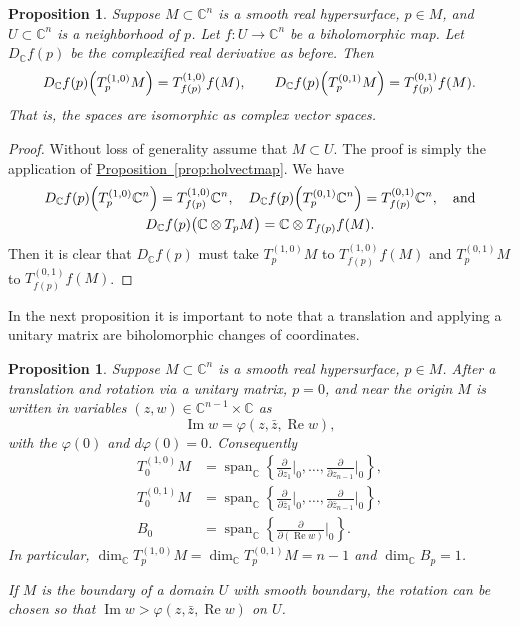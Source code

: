 \documentclass[12pt,openany]{book}
\renewcommand{\Re}{\operatorname{Re}}
\renewcommand{\Im}{\operatorname{Im}}
\newcommand{\C}{{\mathbb{C}}}
\theoremstyle{plain}
\newtheorem{prop}[thm]{Proposition}
\theoremstyle{remark}
\theoremstyle{definition}
\theoremstyle{exercise}
\theoremstyle{example}
\newcommand{\propref}[1]{\hyperref[#1]{Proposition~\ref*{#1}}}
\begin{document}
\begin{prop}
Suppose $M \subset \C^n$ is a smooth real hypersurface, $p \in M$,
and $U \subset \C^n$ is a neighborhood of $p$.
Let $f \colon U \to \C^n$ be a biholomorphic map.  Let $D_\C f(p)$ be
the complexified real derivative as before.  Then
\begin{equation*}
D_\C f(p)\Bigl(T_p^{(1,0)}M\Bigr) = T_{f(p)}^{(1,0)}f(M), \qquad
D_\C f(p)\Bigl(T_p^{(0,1)}M\Bigr) = T_{f(p)}^{(0,1)}f(M).
\end{equation*}
That is, the spaces are isomorphic as complex vector spaces.
\end{prop}

\begin{proof}
Without loss of generality assume that $M \subset U$.
The proof is simply the application of \propref{prop:holvectmap}.  We have
\begin{multline*}
D_\C f(p)\Bigl(T_p^{(1,0)}\C^n\Bigr) = T_{f(p)}^{(1,0)}\C^n, \quad 
D_\C f(p)\Bigl(T_p^{(0,1)}\C^n\Bigr) = T_{f(p)}^{(0,1)}\C^n, \quad
\text{and} \\
D_\C f(p)\bigl(\C \otimes T_pM\bigr) =\C \otimes  T_{f(p)}f(M) .
\end{multline*}
Then it is clear that $D_\C f(p)$ must take
$T_p^{(1,0)}M$ to $T_{f(p)}^{(1,0)}f(M)$ and
$T_p^{(0,1)}M$ to $T_{f(p)}^{(0,1)}f(M)$.
\end{proof}

In the next proposition it is important to note that a translation and
applying a unitary matrix are biholomorphic changes of coordinates.

\begin{prop}
Suppose $M \subset \C^n$ is a smooth real hypersurface, $p \in M$.
After a translation and rotation via a unitary
matrix, $p=0$, and near the origin
$M$ is written in variables $(z,w) \in \C^{n-1}
\times \C$ as
\begin{equation*}
\Im w = \varphi(z,\bar{z},\Re w) ,
\end{equation*}
with the $\varphi(0)$  and $d\varphi(0) = 0$.  Consequently
\begin{align*}
T_0^{(1,0)} M
& = \operatorname{span}_{\C} \left\{
\frac{\partial}{\partial z_1}\Big|_0,
\ldots,
\frac{\partial}{\partial z_{n-1}}\Big|_0 \right\} ,
\\
T_0^{(0,1)} M
& = \operatorname{span}_{\C} \left\{
\frac{\partial}{\partial \bar{z}_1}\Big|_0,
\ldots,
\frac{\partial}{\partial \bar{z}_{n-1}}\Big|_0 \right\} ,
\\
B_0 & = \operatorname{span}_{\C} \left\{
\frac{\partial}{\partial (\Re w)}\Big|_0 \right\} .
\end{align*}
In particular,
$\dim_\C T_p^{(1,0)} M = \dim_\C T_p^{(0,1)} M = n-1$ and 
$\dim_\C B_p = 1$.

If $M$ is the boundary of a domain $U$ with smooth boundary,
the rotation can be chosen so that
$\Im w > \varphi(z,\bar{z},\Re w)$ on $U$.
\end{prop}
\end{document}
